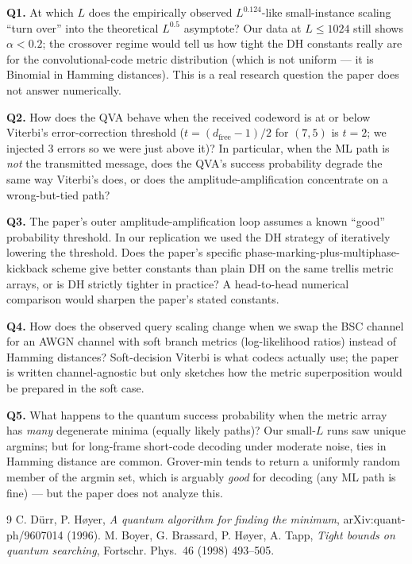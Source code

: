 \documentclass[11pt]{article}
\begin{document}
\textbf{Q1.} At which $L$ does the empirically observed
$L^{0.124}$-like small-instance scaling ``turn over'' into the
theoretical $L^{0.5}$ asymptote? Our data at $L{\le}1024$ still shows
$\alpha<0.2$; the crossover regime would tell us how tight the DH
constants really are for the convolutional-code metric distribution
(which is not uniform --- it is Binomial in Hamming distances). This
is a real research question the paper does not answer numerically.

\textbf{Q2.} How does the QVA behave when the received codeword is at
or below Viterbi's error-correction threshold ($t=(d_{\text{free}}{-}1)/2$
for $(7,5)$ is $t{=}2$; we injected $3$ errors so we were just above
it)? In particular, when the ML path is \emph{not} the transmitted
message, does the QVA's success probability degrade the same way
Viterbi's does, or does the amplitude-amplification concentrate on
a wrong-but-tied path?

\textbf{Q3.} The paper's outer amplitude-amplification loop assumes a
known ``good'' probability threshold. In our replication we used the
DH strategy of iteratively lowering the threshold. Does the paper's
specific phase-marking-plus-multiphase-kickback scheme give better
constants than plain DH on the same trellis metric arrays, or is DH
strictly tighter in practice? A head-to-head numerical comparison
would sharpen the paper's stated constants.

\textbf{Q4.} How does the observed query scaling change when we swap
the BSC channel for an AWGN channel with soft branch metrics
(log-likelihood ratios) instead of Hamming distances? Soft-decision
Viterbi is what codecs actually use; the paper is written
channel-agnostic but only sketches how the metric superposition would
be prepared in the soft case.

\textbf{Q5.} What happens to the quantum success probability when the
metric array has \emph{many} degenerate minima (equally likely
paths)? Our small-$L$ runs saw unique argmins; but for
long-frame short-code decoding under moderate noise, ties in Hamming
distance are common. Grover-min tends to return a uniformly random
member of the argmin set, which is arguably \emph{good} for decoding
(any ML path is fine) --- but the paper does not analyze this.

\begin{thebibliography}{9}
 C. D\"urr, P. H{\o}yer, \emph{A quantum algorithm
  for finding the minimum}, arXiv:quant-ph/9607014 (1996).
 M. Boyer, G. Brassard, P. H{\o}yer, A. Tapp,
  \emph{Tight bounds on quantum searching}, Fortschr. Phys.\ 46
  (1998) 493--505.
\end{thebibliography}
\end{document}
